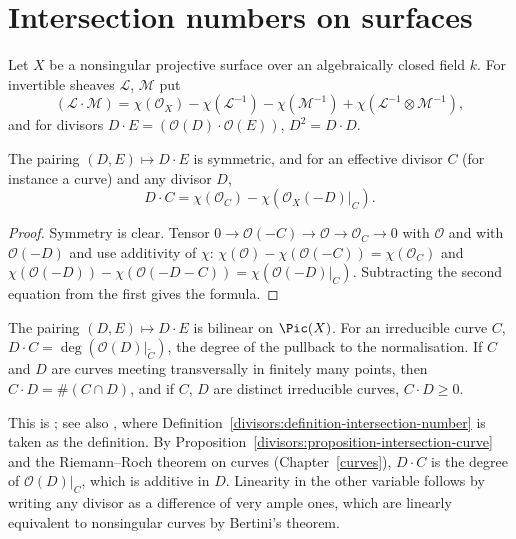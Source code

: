 \section{Intersection numbers on surfaces}\label{divisors:section-intersection-surfaces}

\begin{definition}\label{divisors:definition-intersection-number}
Let $X$ be a nonsingular projective surface over an algebraically closed field $k$. For invertible sheaves $\mathcal{L}$, $\mathcal{M}$ put
\[
(\mathcal{L} \cdot \mathcal{M}) = \chi(\mathcal{O}_X) - \chi(\mathcal{L}^{-1}) - \chi(\mathcal{M}^{-1}) + \chi(\mathcal{L}^{-1} \otimes \mathcal{M}^{-1}),
\]
and for divisors $D \cdot E = (\mathcal{O}(D) \cdot \mathcal{O}(E))$, $D^2 = D \cdot D$.
\end{definition}

\begin{proposition}\label{divisors:proposition-intersection-curve}
The pairing $(D, E) \mapsto D \cdot E$ is symmetric, and for an effective divisor $C$ (for instance a curve) and any divisor $D$,
\[
D \cdot C = \chi(\mathcal{O}_C) - \chi(\mathcal{O}_X(-D)|_C) .
\]
\end{proposition}

\begin{proof}
Symmetry is clear. Tensor $0 \to \mathcal{O}(-C) \to \mathcal{O} \to \mathcal{O}_C \to 0$ with $\mathcal{O}$ and with $\mathcal{O}(-D)$ and use additivity of $\chi$:
$\chi(\mathcal{O}) - \chi(\mathcal{O}(-C)) = \chi(\mathcal{O}_C)$ and $\chi(\mathcal{O}(-D)) - \chi(\mathcal{O}(-D-C)) = \chi(\mathcal{O}(-D)|_C)$. Subtracting the second equation from the first
gives the formula.
\end{proof}

\begin{theorem}\label{divisors:theorem-intersection-pairing}
The pairing $(D, E) \mapsto D \cdot E$ is bilinear on $\Pic(X)$. For an irreducible curve $C$, $D \cdot C = \deg(\mathcal{O}(D)|_{\tilde C})$, the degree of the pullback to the
normalisation. If $C$ and $D$ are curves meeting transversally in finitely many points, then $C \cdot D = \#(C \cap D)$, and if $C$, $D$ are distinct irreducible
curves, $C \cdot D \geq 0$.
\end{theorem}

This is \cite[Theorem V.1.1, Proposition V.1.4 and Exercise V.1.1]{hartshorne-ag}; see also \cite[Chapter I]{beauville-surfaces}, where
Definition~\ref{divisors:definition-intersection-number} is taken as the definition. By Proposition~\ref{divisors:proposition-intersection-curve} and the Riemann--Roch
theorem on curves (Chapter~\ref{curves}), $D \cdot C$ is the degree of $\mathcal{O}(D)|_C$, which is additive in $D$. Linearity in the other variable follows by writing any
divisor as a difference of very ample ones, which are linearly equivalent to nonsingular curves by Bertini's theorem.

